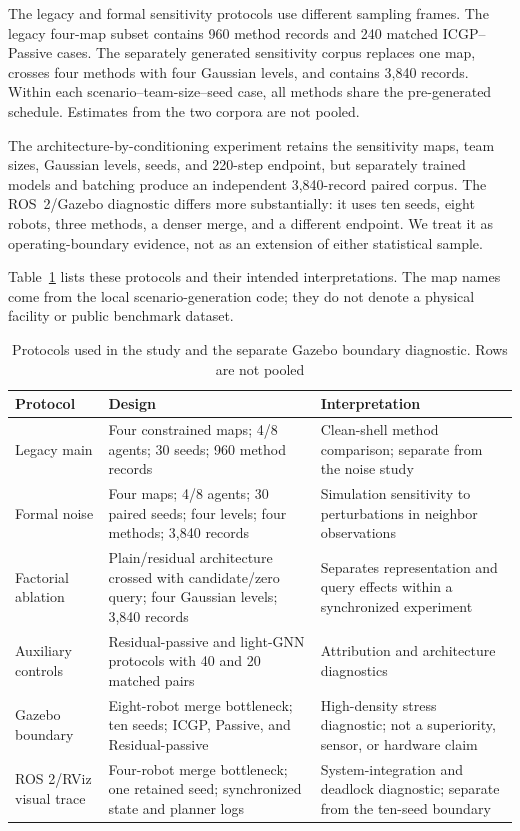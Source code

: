 \documentclass[pdflatex,sn-mathphys-num]{sn-jnl}
\begin{document}
The legacy and formal sensitivity protocols use different sampling frames. The legacy four-map subset contains 960 method records and 240 matched ICGP--Passive cases. The separately generated sensitivity corpus replaces one map, crosses four methods with four Gaussian levels, and contains 3,840 records. Within each scenario--team-size--seed case, all methods share the pre-generated schedule. Estimates from the two corpora are not pooled.

The architecture-by-conditioning experiment retains the sensitivity maps, team sizes, Gaussian levels, seeds, and 220-step endpoint, but separately trained models and batching produce an independent 3,840-record paired corpus. The ROS~2/Gazebo diagnostic differs more substantially: it uses ten seeds, eight robots, three methods, a denser merge, and a different endpoint. We treat it as operating-boundary evidence, not as an extension of either statistical sample.

Table~\ref{tab:protocol} lists these protocols and their intended interpretations. The map names come from the local scenario-generation code; they do not denote a physical facility or public benchmark dataset.

\begin{table}[htbp]
\caption{Protocols used in the study and the separate Gazebo boundary diagnostic. Rows are not pooled}
\label{tab:protocol}
\centering
\scriptsize
\begin{tabular}{@{}>{\raggedright\arraybackslash}p{}@{\hspace{1.1em}}>{\raggedright\arraybackslash}p{}@{\hspace{1.1em}}>{\raggedright\arraybackslash}p{}@{}}
\toprule
\textbf{Protocol} & \textbf{Design} & \textbf{Interpretation} \\
\midrule
Legacy main & Four constrained maps; 4/8 agents; 30 seeds; 960 method records & Clean-shell method comparison; separate from the noise study \\
Formal noise & Four maps; 4/8 agents; 30 paired seeds; four levels; four methods; 3,840 records & Simulation sensitivity to perturbations in neighbor observations \\
Factorial ablation & Plain/residual architecture crossed with candidate/zero query; four Gaussian levels; 3,840 records & Separates representation and query effects within a synchronized experiment \\
Auxiliary controls & Residual-passive and light-GNN protocols with 40 and 20 matched pairs & Attribution and architecture diagnostics \\
Gazebo boundary & Eight-robot merge bottleneck; ten seeds; ICGP, Passive, and Residual-passive & High-density stress diagnostic; not a superiority, sensor, or hardware claim \\
ROS 2/RViz visual trace & Four-robot merge bottleneck; one retained seed; synchronized state and planner logs & System-integration and deadlock diagnostic; separate from the ten-seed boundary \\
\bottomrule
\end{tabular}
\end{table}
\end{document}
